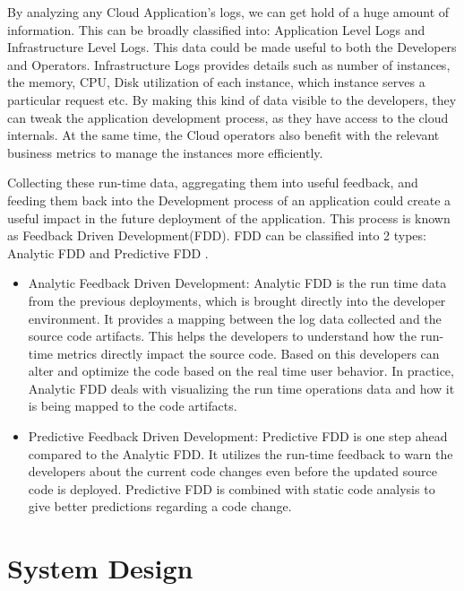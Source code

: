 \documentclass[article,type=msc,colorback,12pt,accentcolor=tud7b]{tudthesis}
\begin{document}
	 By analyzing any Cloud Application's logs, we can get hold of a huge amount of information. This can be broadly classified into: Application Level Logs and Infrastructure Level Logs. This data could be made useful to both the Developers and Operators. Infrastructure Logs provides details such as number of instances, the memory, CPU, Disk utilization of each instance, which instance serves a particular request etc. By making this kind of data visible to the developers, they can tweak the application development process, as they have access to the cloud internals. At the same time, the Cloud operators also benefit with the relevant business metrics to manage the instances more efficiently. 
	
	\par Collecting these run-time data, aggregating them into useful feedback, and feeding them back into the Development process of an application could create a useful impact in the future deployment of the application. This process is known as Feedback Driven Development(FDD). FDD can be classified into 2 types: Analytic FDD and Predictive FDD \cite{cito2015runtime}.
	
	\begin{itemize}
	\item{Analytic Feedback Driven Development: }
		Analytic FDD is the run time data from the previous deployments, which is brought directly into the developer environment. It provides a mapping between the log data collected and the source code artifacts. This helps the developers to understand how the run-time metrics directly impact the source code. Based on this developers can alter and optimize the code based on the real time user behavior. In practice, Analytic FDD deals with visualizing the run time operations data and how it is being mapped to the code artifacts. 
		
	\item{Predictive Feedback Driven Development: }
	Predictive FDD is one step ahead compared to the Analytic FDD. It utilizes the run-time feedback to warn the developers about the current code changes even before the updated source code is deployed. Predictive FDD is combined with static code analysis to give better predictions regarding a code change. 
	\end{itemize}
	
 \cleardoublepage
 \section{System Design}	
 
\end{document}
